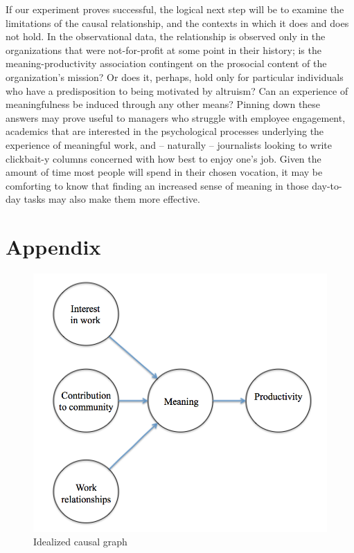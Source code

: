 \documentclass[12pt]{article}
\begin{document}
If our experiment proves successful, the logical next step will be to examine the limitations of the causal relationship, and the contexts in which it does and does not hold. In the observational data, the relationship is observed only in the organizations that were not-for-profit at some point in their history; is the meaning-productivity association contingent on the prosocial content of the organization's mission? Or does it, perhaps, hold only for particular individuals who have a predisposition to being motivated by altruism? Can an experience of meaningfulness be induced through any other means? Pinning down these answers may prove useful to managers who struggle with employee engagement, academics that are interested in the psychological processes underlying the experience of meaningful work, and -- naturally -- journalists looking to write clickbait-y columns concerned with how best to enjoy one's job. Given the amount of time most people will spend in their chosen vocation, it may be comforting to know that finding an increased sense of meaning in those day-to-day tasks may also make them more effective.




\section*{Appendix}

\begin{figure} [!h]
\centering
\includegraphics[scale=0.75]{causal_diagram}
\caption{Idealized causal graph}
\end{figure}
\end{document}
